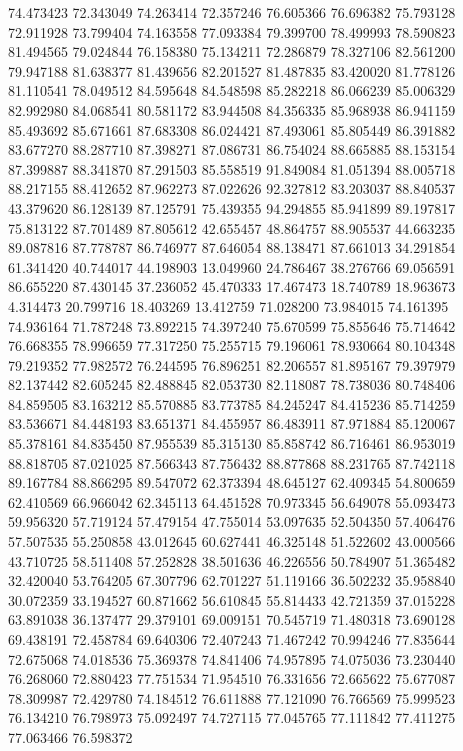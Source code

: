 74.473423
72.343049
74.263414
72.357246
76.605366
76.696382
75.793128
72.911928
73.799404
74.163558
77.093384
79.399700
78.499993
78.590823
81.494565
79.024844
76.158380
75.134211
72.286879
78.327106
82.561200
79.947188
81.638377
81.439656
82.201527
81.487835
83.420020
81.778126
81.110541
78.049512
84.595648
84.548598
85.282218
86.066239
85.006329
82.992980
84.068541
80.581172
83.944508
84.356335
85.968938
86.941159
85.493692
85.671661
87.683308
86.024421
87.493061
85.805449
86.391882
83.677270
88.287710
87.398271
87.086731
86.754024
88.665885
88.153154
87.399887
88.341870
87.291503
85.558519
91.849084
81.051394
88.005718
88.217155
88.412652
87.962273
87.022626
92.327812
83.203037
88.840537
43.379620
86.128139
87.125791
75.439355
94.294855
85.941899
89.197817
75.813122
87.701489
87.805612
42.655457
48.864757
88.905537
44.663235
89.087816
87.778787
86.746977
87.646054
88.138471
87.661013
34.291854
61.341420
40.744017
44.198903
13.049960
24.786467
38.276766
69.056591
86.655220
87.430145
37.236052
45.470333
17.467473
18.740789
18.963673
4.314473
20.799716
18.403269
13.412759
71.028200
73.984015
74.161395
74.936164
71.787248
73.892215
74.397240
75.670599
75.855646
75.714642
76.668355
78.996659
77.317250
75.255715
79.196061
78.930664
80.104348
79.219352
77.982572
76.244595
76.896251
82.206557
81.895167
79.397979
82.137442
82.605245
82.488845
82.053730
82.118087
78.738036
80.748406
84.859505
83.163212
85.570885
83.773785
84.245247
84.415236
85.714259
83.536671
84.448193
83.651371
84.455957
86.483911
87.971884
85.120067
85.378161
84.835450
87.955539
85.315130
85.858742
86.716461
86.953019
88.818705
87.021025
87.566343
87.756432
88.877868
88.231765
87.742118
89.167784
88.866295
89.547072
62.373394
48.645127
62.409345
54.800659
62.410569
66.966042
62.345113
64.451528
70.973345
56.649078
55.093473
59.956320
57.719124
57.479154
47.755014
53.097635
52.504350
57.406476
57.507535
55.250858
43.012645
60.627441
46.325148
51.522602
43.000566
43.710725
58.511408
57.252828
38.501636
46.226556
50.784907
51.365482
32.420040
53.764205
67.307796
62.701227
51.119166
36.502232
35.958840
30.072359
33.194527
60.871662
56.610845
55.814433
42.721359
37.015228
63.891038
36.137477
29.379101
69.009151
70.545719
71.480318
73.690128
69.438191
72.458784
69.640306
72.407243
71.467242
70.994246
77.835644
72.675068
74.018536
75.369378
74.841406
74.957895
74.075036
73.230440
76.268060
72.880423
77.751534
71.954510
76.331656
72.665622
75.677087
78.309987
72.429780
74.184512
76.611888
77.121090
76.766569
75.999523
76.134210
76.798973
75.092497
74.727115
77.045765
77.111842
77.411275
77.063466
76.598372
